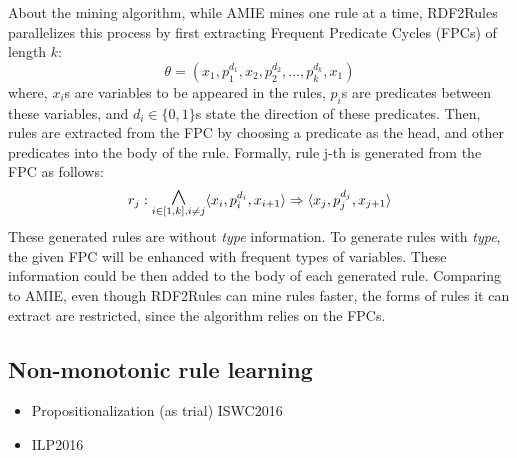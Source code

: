 About the mining algorithm, while AMIE mines one rule at a time, RDF2Rules parallelizes this process by first extracting Frequent Predicate Cycles (FPCs) of length $k$:
\[\theta = (x_1, p_1^{d_1}, x_2, p_2^{d_2}, ..., p_k^{d_k}, x_1)\]
where, $x_i$s are variables to be appeared in the rules, $p_i$s are predicates between these variables, and $d_i \in \{0,1\}$s state the direction of these predicates. Then, rules are extracted from the FPC by choosing a predicate as the head, and other predicates into the body of the rule. Formally, rule j-th is generated from the FPC as follows:
\[r_j: \underset{i \in [1,k], i \ne j}{\mathlarger{\mathlarger{\mathlarger{\wedge}}}} \tuple{x_i,p_i^{d_i},x_{i+1}} \Rightarrow \tuple{x_j,p_j^{d_j},x_{j+1}}\]
These generated rules are without \textit{type} information. To generate rules with \textit{type}, the given FPC will be enhanced with frequent types of variables. These information could be then added to the body of each generated rule. Comparing to AMIE, even though RDF2Rules can mine rules faster, the forms of rules it can extract are restricted, since the algorithm relies on the FPCs.

\subsection{Non-monotonic rule learning}
\begin{itemize}
\item Propositionalization (as trial) ISWC2016
\item ILP2016

\end{itemize}



